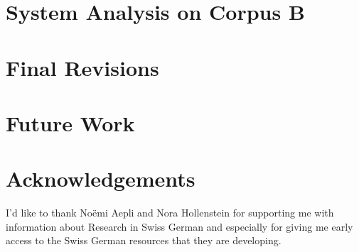 \documentclass[11pt,letterpaper, covington]{article}
\begin{document}
\section{System Analysis on Corpus B}

\section{Final Revisions}

\section{Future Work}


\section{Acknowledgements}
I'd like to thank Noëmi Aepli and Nora Hollenstein for supporting me with information about Research in Swiss German and especially for giving me early access to the Swiss German resources that they are developing. 



\label{lastpage}
\end{document}
